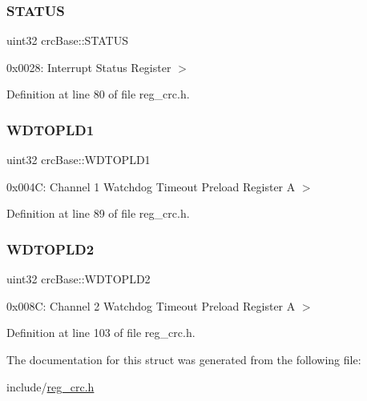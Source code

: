 \subsubsection{\texorpdfstring{S\+T\+A\+T\+US}{STATUS}}
{\footnotesize\ttfamily uint32 crc\+Base\+::\+S\+T\+A\+T\+US}

0x0028\+: Interrupt Status Register $>$ 

Definition at line 80 of file reg\+\_\+crc.\+h.

\mbox{\label{structcrcBase_a2ddcfc8b64176b74dae6f32f0cf2e5e7}} 
\subsubsection{\texorpdfstring{W\+D\+T\+O\+P\+L\+D1}{WDTOPLD1}}
{\footnotesize\ttfamily uint32 crc\+Base\+::\+W\+D\+T\+O\+P\+L\+D1}

0x004C\+: Channel 1 Watchdog Timeout Preload Register A $>$ 

Definition at line 89 of file reg\+\_\+crc.\+h.

\mbox{\label{structcrcBase_ad00315296fe9faf382b5154dbf1ec14c}} 
\subsubsection{\texorpdfstring{W\+D\+T\+O\+P\+L\+D2}{WDTOPLD2}}
{\footnotesize\ttfamily uint32 crc\+Base\+::\+W\+D\+T\+O\+P\+L\+D2}

0x008C\+: Channel 2 Watchdog Timeout Preload Register A $>$ 

Definition at line 103 of file reg\+\_\+crc.\+h.



The documentation for this struct was generated from the following file\+:\begin{DoxyCompactItemize}
\item 
include/\mbox{\hyperlink{reg__crc_8h}{reg\+\_\+crc.\+h}}\end{DoxyCompactItemize}
